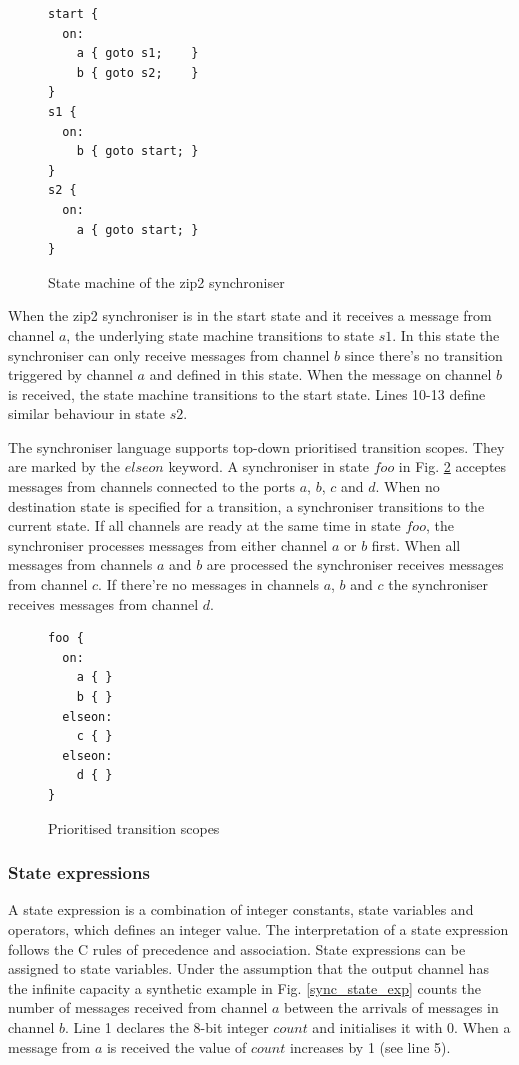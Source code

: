 \begin{figure}[h!]
\lstset{numbers=left, numberstyle=\small, stepnumber=1, numbersep=8pt}
\begin{lstlisting}[frame=single]
start {
  on:
    a { goto s1;    }
    b { goto s2;    }
}
s1 {
  on:
    b { goto start; }
}
s2 {
  on:
    a { goto start; }
}
\end{lstlisting}
\caption{State machine of the zip2 synchroniser}
\label{zip_struc}
\end{figure}

When the zip2 synchroniser is in the start state and it receives a message from channel $a$, the underlying state machine transitions to state $s1$. In this state the synchroniser can only receive messages from channel $b$ since there's no transition triggered by channel $a$ and defined in this state. When the message on channel $b$ is received, the state machine transitions to the start state. Lines 10-13 define similar behaviour in state $s2$.

The synchroniser language supports top-down prioritised transition scopes. They are marked by the $elseon$ keyword. A synchroniser in state $foo$ in Fig. \ref{sync_scope} acceptes messages from channels connected to the ports $a$, $b$, $c$ and $d$. When no destination state is specified for a transition, a synchroniser transitions to the current state. If all channels are ready at the same time in state $foo$, the synchroniser processes messages from either channel $a$ or $b$ first. When all messages from channels $a$ and $b$ are processed the synchroniser receives messages from channel $c$. If there're no messages in channels $a$, $b$ and $c$ the synchroniser receives messages from channel $d$.

\begin{figure}[h!]
\lstset{numbers=left, numberstyle=\small, stepnumber=1, numbersep=8pt}
\begin{lstlisting}[frame=single]
foo {
  on:
    a { }
    b { }
  elseon:
    c { }
  elseon:
    d { }
}
\end{lstlisting}
\caption{Prioritised transition scopes}
\label{sync_scope}
\end{figure}


  \subsubsection{State expressions}
A state expression is a combination of integer constants, state variables and operators, which defines an integer value. The interpretation of a state expression follows the C rules of precedence and association. State expressions can be assigned to state variables. Under the assumption that the output channel has the infinite capacity a synthetic example in Fig. \ref{sync_state_exp} counts the number of messages received from channel $a$ between the arrivals of messages in channel $b$. Line 1 declares the 8-bit integer $count$ and initialises it with 0. When a message from $a$ is received the value of $count$ increases by 1 (see line 5).

